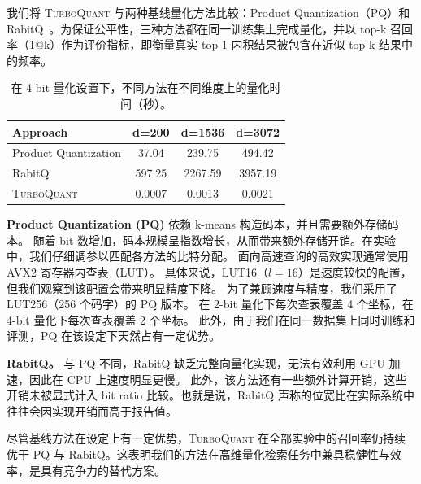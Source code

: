 \documentclass[11pt]{ctexart}
\newcommand{\TurboQuant}{\textsc{TurboQuant}\xspace}
\begin{document}
我们将 \TurboQuant 与两种基线量化方法比较：Product Quantization（PQ）和 RabitQ~\cite{gao2024practical}。为保证公平性，三种方法都在同一训练集上完成量化，并以 top-k 召回率（1@k）作为评价指标，即衡量真实 top-1 内积结果被包含在近似 top-k 结果中的频率。

\begin{table}[ht]
    \centering
    \begin{tabular}{lccc}
        \toprule
        Approach & d=200 & d=1536 & d=3072 \\
        \midrule
        Product Quantization & 37.04 & 239.75 & 494.42 \\
        RabitQ & 597.25 & 2267.59 & 3957.19 \\
        \TurboQuant & 0.0007 & 0.0013 & 0.0021 \\
        \bottomrule
    \end{tabular}
    \caption{在 4-bit 量化设置下，不同方法在不同维度上的量化时间（秒）。}
    \label{tab:quantizing_time}
\end{table}

\textbf{Product Quantization (PQ)} 依赖 k-means 构造码本，并且需要额外存储码本。
随着 bit 数增加，码本规模呈指数增长，从而带来额外存储开销。在实验中，我们仔细调参以匹配各方法的比特分配。
面向高速查询的高效实现通常使用 AVX2 寄存器内查表（LUT）。
具体来说，LUT16（$l=16$）是速度较快的配置，但我们观察到该配置会带来明显精度下降。
为了兼顾速度与精度，我们采用了 LUT256（256 个码字）的 PQ 版本。
在 2-bit 量化下每次查表覆盖 4 个坐标，在 4-bit 量化下每次查表覆盖 2 个坐标。
此外，由于我们在同一数据集上同时训练和评测，PQ 在该设定下天然占有一定优势。

\textbf{RabitQ。}
与 PQ 不同，RabitQ 缺乏完整向量化实现，无法有效利用 GPU 加速，因此在 CPU 上速度明显更慢。
此外，该方法还有一些额外计算开销，这些开销未被显式计入 bit ratio 比较。也就是说，RabitQ 声称的位宽比在实际系统中往往会因实现开销而高于报告值。

尽管基线方法在设定上有一定优势，\TurboQuant 在全部实验中的召回率仍持续优于 PQ 与 RabitQ。这表明我们的方法在高维量化检索任务中兼具稳健性与效率，是具有竞争力的替代方案。
\end{document}
